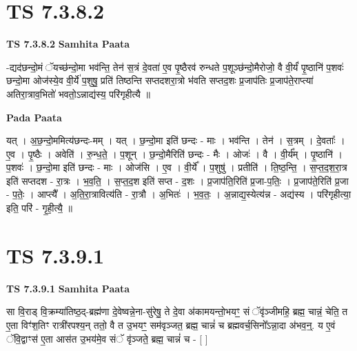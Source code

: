 \documentclass[17pt]{extarticle}
\begin{document}
\section*{ TS 7.3.8.2 }

\textbf{TS 7.3.8.2 } \newline
\textbf{Samhita Paata} \newline

-द्यद॑छन्दो॒मं ॅयच्छ॑न्दो॒मा भव॑न्ति॒ तेन॑ स॒त्रं दे॒वता॑ ए॒व पृ॒ष्ठैरव॑ रुन्धते प॒शूञ्छ॑न्दो॒मैरोजो॒ वै वी॒र्यं॑ पृ॒ष्ठानि॑ प॒शवः॑ छन्दो॒मा ओज॑स्ये॒व वी॒र्ये॑ प॒शुषु॒ प्रति॑ तिष्ठन्ति सप्तदशरा॒त्रो भ॑वति सप्तद॒शः प्र॒जाप॑तिः प्र॒जाप॑ते॒राप्त्या॑ अतिरा॒त्राव॒भितो॑ भवतो॒ऽन्नाद्य॑स्य॒ परि॑गृहीत्यै ॥ \newline

\textbf{Pada Paata} \newline

यत् । अ॒छ॒न्दो॒ममित्य॑छन्दः-मम् । यत् । छ॒न्दो॒मा इति॑ छन्दः - माः । भव॑न्ति । तेन॑ । स॒त्रम् । दे॒वताः᳚ । ए॒व । पृ॒ष्ठैः । अवेति॑ । रु॒न्ध॒ते॒ । प॒शून् । छ॒न्दो॒मैरिति॑ छन्दः - मैः । ओजः॑ । वै । वी॒र्य᳚म् । पृ॒ष्ठानि॑ । प॒शवः॑ । छ॒न्दो॒मा इति॑ छन्दः - माः । ओज॑सि । ए॒व । वी॒र्ये᳚ । प॒शुषु॑ । प्रतीति॑ । ति॒ष्ठ॒न्ति॒ । स॒प्त॒द॒श॒रा॒त्र इति॑ सप्तदश - रा॒त्रः । भ॒व॒ति॒ । स॒प्त॒द॒श इति॑ सप्त - द॒शः । प्र॒जाप॑ति॒रिति॑ प्र॒जा-प॒तिः॒ । प्र॒जाप॑ते॒रिति॑ प्र॒जा - प॒तेः॒ । आप्त्यै᳚ । अ॒ति॒रा॒त्रावित्य॑ति - रा॒त्रौ । अ॒भितः॑ । भ॒व॒तः॒ । अ॒न्नाद्य॒स्येत्य॑न्न - अद्य॑स्य । परि॑गृहीत्या॒ इति॒ परि॑ - गृ॒ही॒त्यै॒ ॥  \newline




\section*{ TS 7.3.9.1 }

\textbf{TS 7.3.9.1 } \newline
\textbf{Samhita Paata} \newline

सा वि॒राड् वि॒क्रम्या॑तिष्ठ॒द्-ब्रह्म॑णा दे॒वेष्वन्ने॒ना-सु॑रेषु॒ ते दे॒वा अ॑कामयन्तो॒भयꣳ॒॒ सं ॅवृ॑ञ्जीमहि॒ ब्रह्म॒ चान्नं॒ चेति॒ त ए॒ता विꣳ॑श॒तिꣳ रात्री॑रपश्य॒न् ततो॒ वै त उ॒भयꣳ॒॒ सम॑वृञ्जत॒ ब्रह्म॒ चान्नं॑ च ब्रह्मवर्च॒सिनो᳚ऽन्ना॒दा अ॑भव॒न्॒. य ए॒वं ॅवि॒द्वाꣳस॑ ए॒ता आस॑त उ॒भय॑मे॒व संॅ वृ॑ञ्जते॒ ब्रह्म॒ चान्नं॑ च - [  ] \newline
\end{document}
